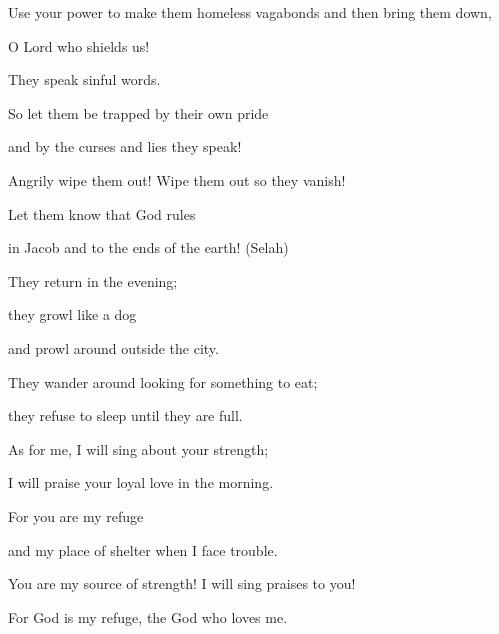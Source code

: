 {\par }{\Q Use your power to make them homeless vagabonds
and then bring them down,
\par }{\Q O Lord
who shields us!
\par }{\Q {}They speak
sinful
words.
\par }{\Q So let them be trapped
by their own pride
\par }{\Q and by the curses
and lies
they speak!
\par }{\Q {}Angrily
wipe
them out! Wipe
them out so they vanish!
\par }{\Q Let them
know
that
God
rules
\par }{\Q in Jacob
and to the ends
of the earth! (Selah)
\par }{\Q {}They return
in the evening;
\par }{\Q they growl
like a dog
\par }{\Q and prowl around outside
the city.
\par }{\Q {}They
wander
around looking for something to eat;
\par }{\Q they refuse to sleep
until they are full.
\par }{\Q {}As for me, I
will sing
about your strength;
\par }{\Q I will praise
your loyal love
in the morning.
\par }{\Q For
you are my refuge
\par }{\Q and my place of shelter
when
I face trouble.
\par }{\Q {}You are my source of strength! I will sing praises
to you!

\par }{\Q For
God
is my refuge,
the God
who loves me.


\par }
